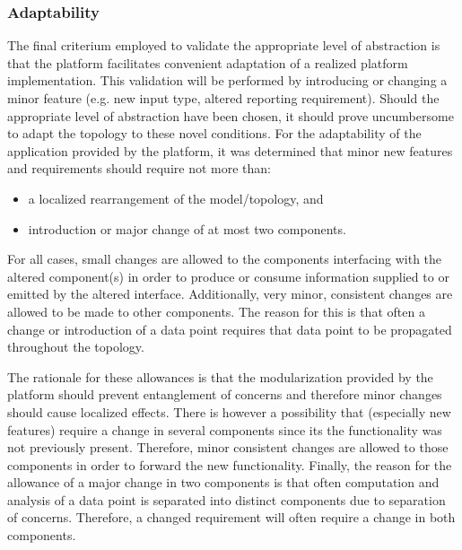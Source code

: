 \subsubsection{Adaptability}
The final criterium employed to validate the appropriate level of abstraction is that the platform facilitates convenient adaptation of a realized platform implementation. This validation will be performed by introducing or changing a minor feature (e.g. new input type, altered reporting requirement). Should the appropriate level of abstraction have been chosen, it should prove uncumbersome to adapt the topology to these novel conditions. For the adaptability of the application provided by the platform, it was determined that minor new features and requirements should require not more than:
\begin{itemize}
\nospace
\item a localized rearrangement of the model/topology, and
\item introduction or major change of at most two components.
\end{itemize}
For all cases, small changes are allowed to the components interfacing with the altered component(s) in order to produce or consume information supplied to or emitted by the altered interface. Additionally, very minor, consistent changes are allowed to be made to other components. The reason for this is that often a change or introduction of a data point requires that data point to be propagated throughout the topology.

The rationale for these allowances is that the modularization provided by the platform should prevent entanglement of concerns and therefore minor changes should cause localized effects. There is however a possibility that (especially new features) require a change in several components since its the functionality was not previously present. Therefore, minor consistent changes are allowed to those components in order to forward the new functionality. Finally, the reason for the allowance of a major change in two components is that often computation and analysis of a data point is separated into distinct components due to separation of concerns. Therefore, a changed requirement will often require a change in both components.


